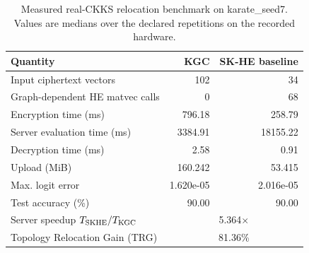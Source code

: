 \begin{table}[t]
\centering
\caption{Measured real-CKKS relocation benchmark on karate\_seed7. Values are medians over the declared repetitions on the recorded hardware.}
\label{tab:real-ckks}
\begin{tabular}{lrr}
\toprule
Quantity & KGC & SK-HE baseline \\
\midrule
Input ciphertext vectors & 102 & 34 \\
Graph-dependent HE matvec calls & 0 & 68 \\
Encryption time (ms) & 796.18 & 258.79 \\
Server evaluation time (ms) & 3384.91 & 18155.22 \\
Decryption time (ms) & 2.58 & 0.91 \\
Upload (MiB) & 160.242 & 53.415 \\
Max. logit error & 1.620e-05 & 2.016e-05 \\
Test accuracy (\%) & 90.00 & 90.00 \\
\midrule
Server speedup $T_{\rm SKHE}/T_{\rm KGC}$ & \multicolumn{2}{c}{5.364$\times$} \\
Topology Relocation Gain (TRG) & \multicolumn{2}{c}{81.36\%} \\
\bottomrule
\end{tabular}
\end{table}
